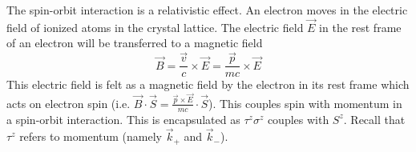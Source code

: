 \documentclass[12pt,a4paper,titlepage]{article}
\begin{document}
The spin-orbit interaction is a relativistic effect. An electron moves in the electric field of ionized atoms in the crystal lattice. The electric field $\vec{E}$ in the rest frame of an electron will be transferred to a magnetic field
\begin{equation}
\vec{B}=\frac{\vec{v}}{c}\times\vec{E}=\frac{\vec{p}}{mc}\times\vec{E}
\end{equation}
This electric field is felt as a magnetic field by the electron in its rest frame which acts on electron spin (i.e. $\vec{B}\cdot\vec{S}=\frac{\vec{p}\times\vec{E}}{mc}\cdot\vec{S}$). This couples spin with momentum in a spin-orbit interaction. This is encapsulated as $\tau^{z}\sigma^{z}$ couples with $S^{z}$. Recall that $\tau^{z}$ refers to momentum (namely $\vec{k}_{+}$ and $\vec{k}_{-}$).\\
\end{document}
